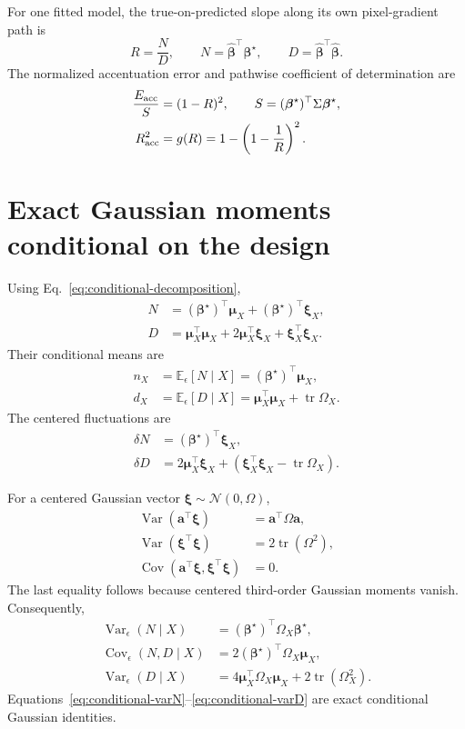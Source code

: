 \documentclass[11pt]{article}
\newcommand{\E}{\mathbb{E}}
\newcommand{\Var}{\operatorname{Var}}
\newcommand{\Cov}{\operatorname{Cov}}
\newcommand{\tr}{\operatorname{tr}}
\newcommand{\bhat}{\widehat{\bm\beta}}
\newcommand{\bstar}{\bm\beta^\star}
\begin{document}
For one fitted model, the true-on-predicted slope along its own pixel-gradient
path is
\begin{equation}
  R=\frac{N}{D},\qquad
  N=\bhat^\top\bstar,\qquad
  D=\bhat^\top\bhat.
  \label{eq:R-definition}
\end{equation}
The normalized accentuation error and pathwise coefficient of determination
are
\begin{align}
  \frac{E_{\rm acc}}{S}&=(1-R)^2,
  \qquad S=(\bstar)^\top\Sigma\bstar,
  \label{eq:Eacc-R}\\
  R^2_{\rm acc}&=g(R)
  =1-\left(1-\frac{1}{R}\right)^2.
  \label{eq:R2acc-R}
\end{align}

\section{Exact Gaussian moments conditional on the design}

Using Eq.~\eqref{eq:conditional-decomposition},
\begin{align}
  N&=(\bstar)^\top\bm\mu_X+(\bstar)^\top\bm\xi_X,\\
  D&=\bm\mu_X^\top\bm\mu_X
  +2\bm\mu_X^\top\bm\xi_X+\bm\xi_X^\top\bm\xi_X.
\end{align}
Their conditional means are
\begin{align}
  n_X&=\E_\epsilon[N\mid X]
       =(\bstar)^\top\bm\mu_X,
  \label{eq:nX}\\
  d_X&=\E_\epsilon[D\mid X]
       =\bm\mu_X^\top\bm\mu_X+\tr\Omega_X.
  \label{eq:dX}
\end{align}
The centered fluctuations are
\begin{align}
  \delta N&=(\bstar)^\top\bm\xi_X,\\
  \delta D&=2\bm\mu_X^\top\bm\xi_X
       +\left(\bm\xi_X^\top\bm\xi_X-\tr\Omega_X\right).
\end{align}

For a centered Gaussian vector \(\bm\xi\sim\mathcal N(0,\Omega)\),
\begin{align}
  \Var(\bm a^\top\bm\xi)&=\bm a^\top\Omega\bm a,\\
  \Var(\bm\xi^\top\bm\xi)&=2\tr(\Omega^2),\\
  \Cov(\bm a^\top\bm\xi,\bm\xi^\top\bm\xi)&=0.
\end{align}
The last equality follows because centered third-order Gaussian moments vanish.
Consequently,
\begin{align}
  \Var_\epsilon(N\mid X)
    &=(\bstar)^\top\Omega_X\bstar,
  \label{eq:conditional-varN}\\
  \Cov_\epsilon(N,D\mid X)
    &=2(\bstar)^\top\Omega_X\bm\mu_X,
  \label{eq:conditional-covND}\\
  \Var_\epsilon(D\mid X)
    &=4\bm\mu_X^\top\Omega_X\bm\mu_X
      +2\tr(\Omega_X^2).
  \label{eq:conditional-varD}
\end{align}
Equations~\eqref{eq:conditional-varN}--\eqref{eq:conditional-varD} are exact
conditional Gaussian identities.
\end{document}

